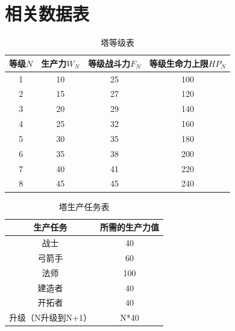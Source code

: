 \documentclass[a4paper,4pt]{article}
\begin{document}
\section{相关数据表}
\begin{table}[htbp]
	\centering
	\caption{塔等级表}
	\label{塔等级表}%
	\begin{tabular}{c|c|c|c}
		\hline
		等级$N$ & 生产力$W_N$ & 等级战斗力$F_N$ & 等级生命力上限$HP_N$ \bigstrut \\
		\hline
		1       & 10          & 25              & 100 \bigstrut                  \\
		\hline
		2       & 15          & 27              & 120 \bigstrut                  \\
		\hline
		3       & 20          & 29              & 140 \bigstrut                  \\
		\hline
		4       & 25          & 32              & 160 \bigstrut                  \\
		\hline
		5       & 30          & 35              & 180 \bigstrut                  \\
		\hline
		6       & 35          & 38              & 200 \bigstrut                  \\
		\hline
		7       & 40          & 41              & 220 \bigstrut                  \\
		\hline
		8       & 45          & 45              & 240 \bigstrut                  \\
		\hline
	\end{tabular}%

\end{table}%




\begin{table}[htbp]
	\centering
	\caption{塔生产任务表}
	\begin{tabular}{c|c}
		\hline
		生产任务           & 所需的生产力值 \bigstrut \\
		\hline
		战士               & 40 \bigstrut             \\
		\hline
		弓箭手             & 60 \bigstrut             \\
		\hline
		法师               & 100 \bigstrut            \\
		\hline
		建造者             & 40 \bigstrut             \\
		\hline
		开拓者             & 40 \bigstrut             \\
		\hline
		升级（N升级到N+1） & N*40 \bigstrut           \\
		\hline
	\end{tabular}%
	\label{塔生产}%
\end{table}%
\end{document}
